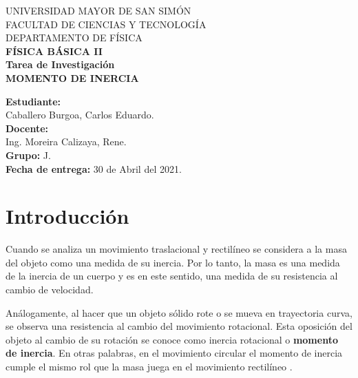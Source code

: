 \documentclass[letter,11pt]{article}
\begin{document}
\begin{titlepage}
\begin{center}
{\Large UNIVERSIDAD MAYOR DE SAN SIMÓN}\\
\vspace*{0.15cm}
{\large FACULTAD DE CIENCIAS Y TECNOLOGÍA}\\
\vspace*{0.10cm}
DEPARTAMENTO DE FÍSICA\\
\vspace*{3.0cm}
{\Large \textbf{FÍSICA BÁSICA II}}\\
\vspace*{0.3cm}
{\Large \textbf{Tarea de Investigación}}\\
\vspace*{3.5cm}
{\Large \textbf{MOMENTO DE INERCIA}}\\
\end{center}

\vspace*{7.8cm}
\leftskip=7.95cm
\noindent
\textbf{Estudiante:}\\
Caballero Burgoa, Carlos Eduardo.\\
\newline
\textbf{Docente:}\\
Ing. Moreira Calizaya, Rene.\\
\newline
\textbf{Grupo:} J.\\
\textbf{Fecha de entrega:} 30 de Abril del 2021.\\

\end{titlepage}

\section{Introducción}
Cuando se analiza un movimiento traslacional y rectilíneo se considera a la masa
del objeto como una medida de su inercia. Por lo tanto, la masa es una medida de
la inercia de un cuerpo y es en este sentido, una medida de su resistencia al
cambio de velocidad.

Análogamente, al hacer que un objeto sólido rote o se mueva en trayectoria
curva, se observa una resistencia al cambio del movimiento rotacional. Esta
oposición del objeto al cambio de su rotación se conoce como inercia rotacional
o \textbf{momento de inercia}. En otras palabras, en el movimiento circular el
momento de inercia cumple el mismo rol que la masa juega en el movimiento
rectilíneo \cite{FISIC.CH}.
\end{document}
